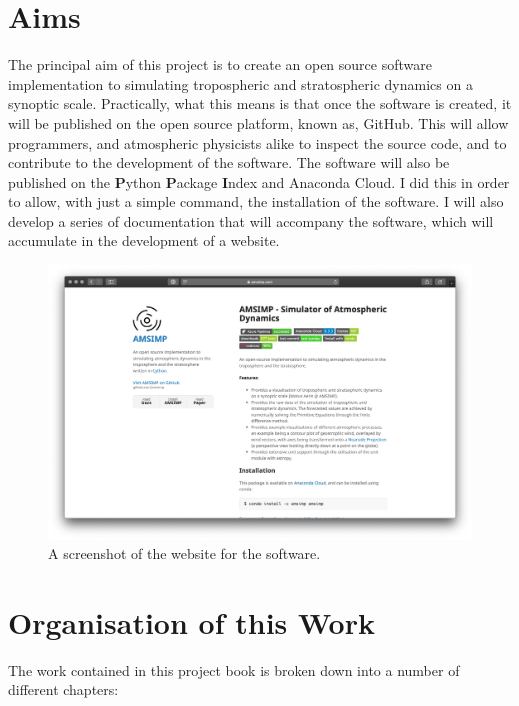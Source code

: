 \section{Aims}
The principal aim of this project is to create an open source software implementation to simulating tropospheric and stratospheric dynamics on a synoptic scale. Practically, what this means is that once the software is created, it will be published on the open source platform, known as, GitHub. This will allow programmers, and atmospheric physicists alike to inspect the source code, and to contribute to the development of the software. The software will also be published on the \textbf{P}ython \textbf{P}ackage \textbf{I}ndex and Anaconda Cloud. I did this in order to allow, with just a simple command, the installation of the software. I will also develop a series of documentation that will accompany the software, which will accumulate in the development of a website.   

\begin{figure}[H]
    \centering
    \includegraphics[width=.8\linewidth]{Images/website}
    \caption{A screenshot of the website for the software.}
    \label{website}
\end{figure}

\section{Organisation of this Work}
The work contained in this project book is broken down into a number of different chapters:

